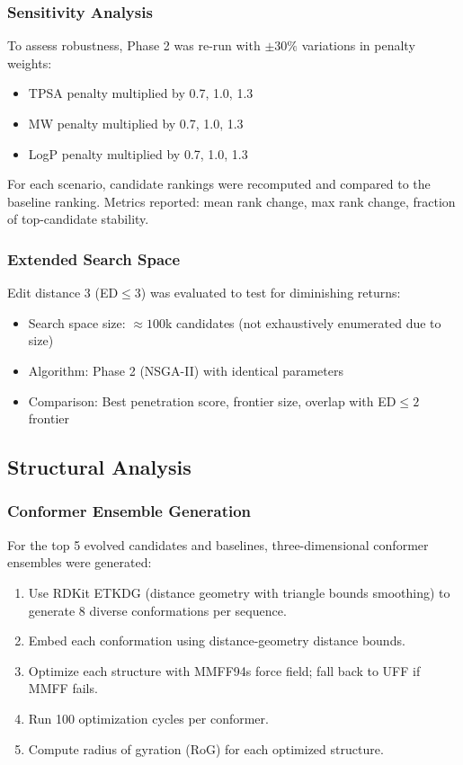\documentclass[11pt,a4paper]{article}
\begin{document}
\subsubsection{Sensitivity Analysis}

To assess robustness, Phase 2 was re-run with $\pm 30\%$ variations in penalty weights:
\begin{itemize}
  \item TPSA penalty multiplied by 0.7, 1.0, 1.3
  \item MW penalty multiplied by 0.7, 1.0, 1.3
  \item LogP penalty multiplied by 0.7, 1.0, 1.3
\end{itemize}

For each scenario, candidate rankings were recomputed and compared to the baseline ranking. Metrics reported: mean rank change, max rank change, fraction of top-candidate stability.

\subsubsection{Extended Search Space}

Edit distance 3 (ED$\leq 3$) was evaluated to test for diminishing returns:
\begin{itemize}
  \item Search space size: $\approx 100$k candidates (not exhaustively enumerated due to size)
  \item Algorithm: Phase 2 (NSGA-II) with identical parameters
  \item Comparison: Best penetration score, frontier size, overlap with ED$\leq 2$ frontier
\end{itemize}

\subsection{Structural Analysis}

\subsubsection{Conformer Ensemble Generation}

For the top 5 evolved candidates and baselines, three-dimensional conformer ensembles were generated:
\begin{enumerate}
  \item Use RDKit ETKDG (distance geometry with triangle bounds smoothing) to generate 8 diverse conformations per sequence.
  \item Embed each conformation using distance-geometry distance bounds.
  \item Optimize each structure with MMFF94s force field; fall back to UFF if MMFF fails.
  \item Run 100 optimization cycles per conformer.
  \item Compute radius of gyration (RoG) for each optimized structure.
\end{enumerate}
\end{document}
